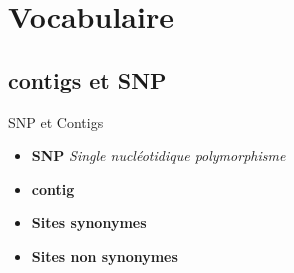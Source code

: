 %            
%
%    
%           
%
%    


\section{Vocabulaire}
\begin{frame}
	\tableofcontents[sectionstyle=show/shaded,subsectionstyle=show/show/hide,subsubsectionstyle=show/show/hide]
\end{frame}

\subsection{contigs et SNP}

\begin{frame}{SNP et Contigs}

    \begin{itemize}
        \item  \textbf{SNP} \textit{Single nucléotidique polymorphisme}

        \item  \textbf{contig}
    \end{itemize}
 

    \begin{itemize}
        \item \textbf{Sites synonymes}
        \item \textbf{Sites non synonymes}
    \end{itemize}
\end{frame}

